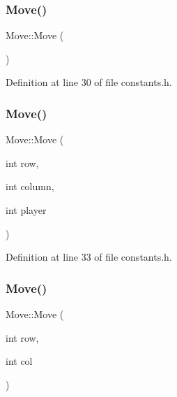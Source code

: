 \subsubsection{\texorpdfstring{Move()}{Move()}\hspace{0.1cm}{\footnotesize\ttfamily [1/3]}}
{\footnotesize\ttfamily Move\+::\+Move (\begin{DoxyParamCaption}{ }\end{DoxyParamCaption})\hspace{0.3cm}{\ttfamily [inline]}}



Definition at line 30 of file constants.\+h.

\mbox{\label{struct_move_aa1dd034928b13fc8a02f48bfa10f44e8}} 
\subsubsection{\texorpdfstring{Move()}{Move()}\hspace{0.1cm}{\footnotesize\ttfamily [2/3]}}
{\footnotesize\ttfamily Move\+::\+Move (\begin{DoxyParamCaption}\item[{int}]{row,  }\item[{int}]{column,  }\item[{int}]{player }\end{DoxyParamCaption})\hspace{0.3cm}{\ttfamily [inline]}}



Definition at line 33 of file constants.\+h.

\mbox{\label{struct_move_ad8cc48006b681c9517082101d2d0c5c5}} 
\subsubsection{\texorpdfstring{Move()}{Move()}\hspace{0.1cm}{\footnotesize\ttfamily [3/3]}}
{\footnotesize\ttfamily Move\+::\+Move (\begin{DoxyParamCaption}\item[{int}]{row,  }\item[{int}]{col }\end{DoxyParamCaption})\hspace{0.3cm}{\ttfamily [inline]}}



